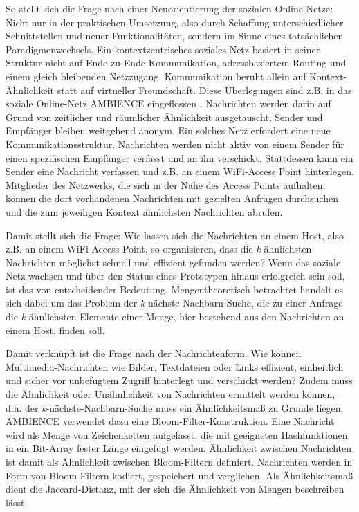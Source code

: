 So stellt sich die Frage nach einer Neuorientierung der sozialen Online-Netze: Nicht nur in der praktischen Umsetzung, also durch Schaffung unterschiedlicher Schnittstellen und neuer Funktionalitäten, sondern im Sinne eines tatsächlichen Paradigmenwechsels. Ein kontextzentrisches soziales Netz basiert in seiner Struktur nicht auf Ende-zu-Ende-Kommunikation, adressbasiertem  Routing und einem gleich bleibenden Netzzugang. Kommunikation beruht allein auf Kontext-Ähnlichkeit statt auf virtueller Freundschaft. Diese Überlegungen sind z.B. in das soziale Online-Netz AMBIENCE eingeflossen \cite{Werner2015}. Nachrichten werden darin auf Grund von zeitlicher und räumlicher Ähnlichkeit ausgetauscht, Sender und Empfänger bleiben weitgehend anonym. Ein solches Netz erfordert eine neue Kommunikationsstruktur. Nachrichten werden nicht aktiv von einem Sender für einen spezifischen Empfänger verfasst und an ihn verschickt. Stattdessen kann ein Sender eine Nachricht verfassen und z.B. an einem WiFi-Access Point hinterlegen. Mitglieder des Netzwerks, die sich in der Nähe des Access Points aufhalten, können die dort vorhandenen Nachrichten mit gezielten Anfragen durchsuchen und die zum jeweiligen Kontext ähnlichsten Nachrichten abrufen. 

Damit stellt sich die Frage: Wie lassen sich die Nachrichten an einem Host, also z.B. an einem WiFi-Access Point, so organisieren, dass die \textit{k} ähnlichsten Nachrichten möglichst schnell und effizient gefunden werden?  Wenn das soziale Netz wachsen und über den Status eines Prototypen hinaus erfolgreich sein soll, ist das von entscheidender Bedeutung. Mengentheoretisch betrachtet handelt es sich dabei um das Problem der \textit{k}-nächste-Nachbarn-Suche, die zu einer Anfrage die \textit{k} ähnlichsten Elemente einer Menge, hier bestehend aus den Nachrichten an einem Host, finden soll. 

Damit verknüpft ist die Frage nach der Nachrichtenform. Wie können Multimedia-Nach\-rich\-ten wie Bilder, Textdateien oder Links effizient, einheitlich und sicher vor unbefugtem Zugriff hinterlegt und verschickt werden? Zudem muss die Ähnlichkeit oder Unähnlichkeit von Nachrichten ermittelt werden können, d.h. der \textit{k}-nächste-Nachbarn-Suche muss ein Ähnlichkeitsmaß zu Grunde liegen. AMBIENCE verwendet dazu eine Bloom-Filter-Konstruktion. Eine Nachricht wird als Menge von Zeichenketten aufgefasst, die mit geeigneten Hashfunktionen in ein Bit-Array fester Länge eingefügt werden. Ähnlichkeit zwischen Nachrichten ist damit als Ähnlichkeit zwischen Bloom-Filtern definiert. Nachrichten werden in Form von Bloom-Filtern kodiert, gespeichert und verglichen. Als Ähnlichkeitsmaß dient die Jaccard-Distanz, mit der sich die Ähnlichkeit von Mengen beschreiben lässt. 

